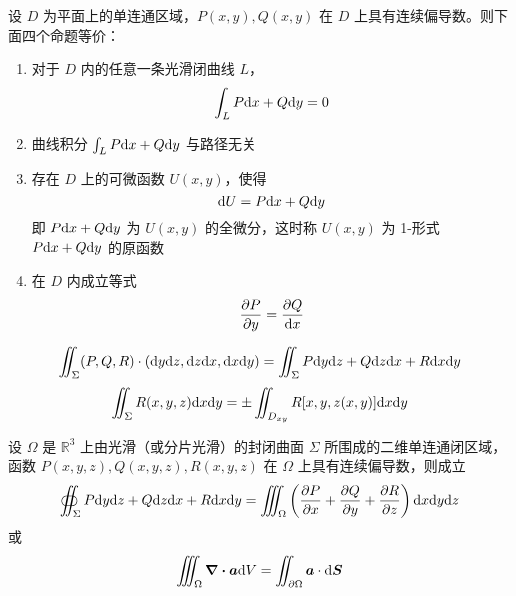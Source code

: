 \documentclass{ctexbook}
\def\diff{\textnormal{d}}
\begin{document}
\begin{theorem}[Green 定理]
    设 $D$ 为平面上的单连通区域，$P(x,y),Q(x,y)$ 在 $D$ 上具有连续偏导数。则下面四个命题等价：
    \begin{enumerate}
        \item 对于 $D$ 内的任意一条光滑闭曲线 $L$，
        \begin{equation}
            \int_L P\diff x+Q\diff y=0
        \end{equation}
        \item 曲线积分 $\int_L P\diff x+Q\diff y$ 与路径无关
        \item 存在 $D$ 上的可微函数 $U(x,y)$，使得
        \begin{equation}
            \diff U=P\diff x+Q\diff y
        \end{equation}
        即 $P\diff x+Q\diff y$ 为 $U(x,y)$ 的全微分，这时称 $U(x,y)$ 为 1-形式 $P\diff x+Q\diff y$ 的原函数
        \item 在 $D$ 内成立等式
        \begin{equation}
            \frac{\partial P}{\partial y}=\frac{\partial Q}{\diff x}
        \end{equation}
    \end{enumerate}    
\end{theorem}

\begin{definition}[第二类曲面积分]
    \begin{equation}
        \iint_\Sigma (P,Q,R)\cdot(\diff y\diff z,\diff z\diff x,\diff x\diff y)=\iint_\Sigma P\diff y\diff z+Q\diff z\diff x+R\diff x\diff y
    \end{equation}
    \begin{equation}
        \iint_\Sigma R(x,y,z)\diff x\diff y=\pm\iint_{D_{xy}}R[x,y,z(x,y)]\diff x\diff y
    \end{equation}
\end{definition}

\begin{theorem}[Guass 公式]
    设 $\Omega$ 是 $\mathbb{R}^3$ 上由光滑（或分片光滑）的封闭曲面 $\Sigma$ 所围成的二维单连通闭区域，函数 $P(x,y,z),Q(x,y,z),R(x,y,z)$ 在 $\Omega$ 上具有连续偏导数，则成立
    \begin{equation}
        \oiint_\Sigma P\diff y\diff z+Q\diff z\diff x+R\diff x\diff y = \iiint_\Omega\left(\frac{\partial P}{\partial x}+\frac{\partial Q}{\partial y}+\frac{\partial R}{\partial z}\right)\diff x\diff y\diff z
    \end{equation}
    或
    \begin{equation}
        \iiint_\Omega \div \boldsymbol{a}\diff V=\iint_{\partial \Omega}\boldsymbol{a}\cdot\diff \boldsymbol{S}
    \end{equation}
\end{theorem}
\end{document}

